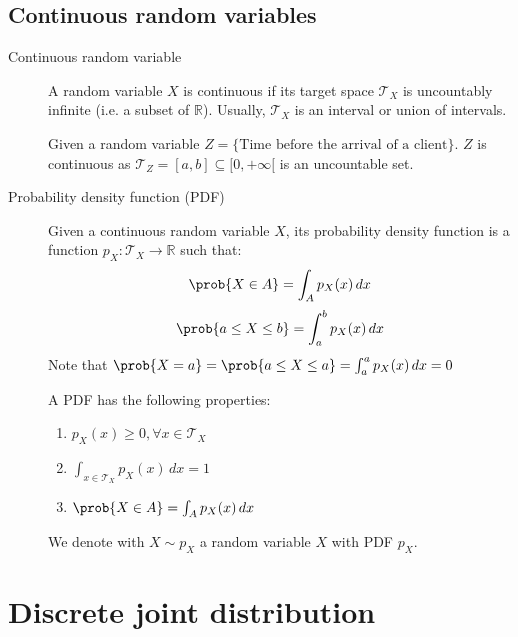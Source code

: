 \subsection{Continuous random variables}

\begin{description}
    \item[Continuous random variable] 
        A random variable $X$ is continuous if its target space $\mathcal{T}_X$ is uncountably infinite (i.e. a subset of $\mathbb{R}$).
        Usually, $\mathcal{T}_X$ is an interval or union of intervals.

        \begin{example}
            Given a random variable $Z = \{ \text{Time before the arrival of a client} \}$.
            $Z$ is continuous as $\mathcal{T}_Z = [a, b] \subseteq [0, +\infty[$ is an uncountable set.
        \end{example}

    \item[Probability density function (PDF)] 
        Given a continuous random variable $X$, 
        its probability density function is a function $p_X: \mathcal{T}_X \rightarrow \mathbb{R}$ such that:
        \[ \prob{X \in A} = \int_{A} p_X(x) \,dx \]
        \[ \prob{a \leq X \leq b} = \int_{a}^{b} p_X(x) \,dx \]
        Note that $\prob{X = a} = \prob{a \leq X \leq a} = \int_{a}^{a} p_X(x) \,dx = 0$

        A PDF has the following properties:
        \begin{enumerate}
            \item $p_X(x) \geq 0, \forall x \in \mathcal{T}_X$ 
            \item $\int_{x \in  \mathcal{T}_X} p_X(x) \,dx = 1$
            \item $\prob{X \in A} =  \int_{A} p_X(x) \,dx$
        \end{enumerate}

        We denote with $X \sim p_X$ a random variable $X$ with PDF $p_X$.
    \end{description}



\section{Discrete joint distribution}

